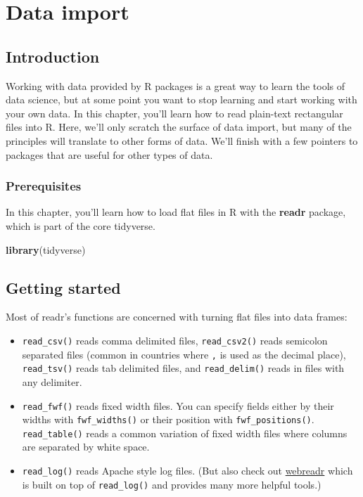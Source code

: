 \documentclass[]{book}
\newenvironment{Shaded}{\begin{snugshade}}{\end{snugshade}}
\newcommand{\KeywordTok}[1]{\textcolor[rgb]{0.13,0.29,0.53}{\textbf{{#1}}}}
\newcommand{\NormalTok}[1]{{#1}}
\begin{document}
\hypertarget{data-import}{\chapter{Data import}\label{data-import}}

\section{Introduction}\label{introduction-5}

Working with data provided by R packages is a great way to learn the
tools of data science, but at some point you want to stop learning and
start working with your own data. In this chapter, you'll learn how to
read plain-text rectangular files into R. Here, we'll only scratch the
surface of data import, but many of the principles will translate to
other forms of data. We'll finish with a few pointers to packages that
are useful for other types of data.

\subsection{Prerequisites}\label{prerequisites-5}

In this chapter, you'll learn how to load flat files in R with the
\textbf{readr} package, which is part of the core tidyverse.

\begin{Shaded}
\begin{Highlighting}[]
\KeywordTok{library}\NormalTok{(tidyverse)}
\end{Highlighting}
\end{Shaded}

\section{Getting started}\label{getting-started}

Most of readr's functions are concerned with turning flat files into
data frames:

\begin{itemize}
\item
  \texttt{read\_csv()} reads comma delimited files,
  \texttt{read\_csv2()} reads semicolon separated files (common in
  countries where \texttt{,} is used as the decimal place),
  \texttt{read\_tsv()} reads tab delimited files, and
  \texttt{read\_delim()} reads in files with any delimiter.
\item
  \texttt{read\_fwf()} reads fixed width files. You can specify fields
  either by their widths with \texttt{fwf\_widths()} or their position
  with \texttt{fwf\_positions()}. \texttt{read\_table()} reads a common
  variation of fixed width files where columns are separated by white
  space.
\item
  \texttt{read\_log()} reads Apache style log files. (But also check out
  \href{https://github.com/Ironholds/webreadr}{webreadr} which is built
  on top of \texttt{read\_log()} and provides many more helpful tools.)
\end{itemize}
\end{document}
